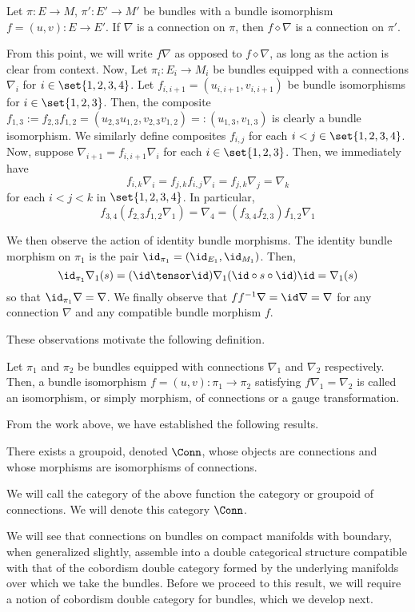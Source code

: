 \begin{thm}
Let $\pi : E \to M$, $\pi' : E' \to M'$ be bundles with a bundle isomorphism
$f = (u, v) : E \to E'$. If $\nabla$ is a connection on $\pi$, then
$f \diamond \nabla$ is a connection on $\pi'$.
\end{thm}

From this point, we will write $f\nabla$ as opposed to $f \diamond \nabla$,
as long as the action is clear from context. Now, Let $\pi_i : E_i \to M_i$ be
bundles equipped with a connections
$\nabla_i$ for $i \in \set{1, 2, 3, 4}$. Let
$f_{i, i + 1} = (u_{i, i + 1}, v_{i, i + 1})$
be bundle isomorphisms for $i \in \set{1, 2, 3}$. Then, the composite
$f_{1, 3} := f_{2, 3}f_{1, 2} = (u_{2, 3}u_{1, 2}, v_{2, 3}v_{1, 2})
=: (u_{1, 3}, v_{1, 3})$ is clearly a bundle isomorphism. We similarly define
composites $f_{i, j}$ for each $i < j \in \set{1, 2, 3, 4}$. Now, suppose
$\nabla_{i + 1} = f_{i, i + 1}\nabla_i$ for each $i \in \set{1, 2, 3}$. Then, we
immediately have
\[
  f_{i, k}\nabla_i = f_{j, k}f_{i, j}\nabla_i = f_{j, k}\nabla_j = \nabla_k
\]
for each $i < j < k$ in $\set{1, 2, 3, 4}$. In particular,
\[
  f_{3, 4}(f_{2, 3}f_{1, 2}\nabla_1) = \nabla_4
    = (f_{3, 4}f_{2, 3})f_{1, 2}\nabla_1
\]

We then observe the action of identity bundle morphisms. The identity bundle
morphism on $\pi_1$ is the pair $\id_{\pi_1} = (\id_{E_1}, \id_{M_1})$. Then,
\[
  \id_{\pi_1}\nabla_1(s)
    = (\id \tensor \id) \nabla_1(\id \circ s \circ \id) \id
    = \nabla_1(s)
\]
so that $\id_{\pi_1}\nabla = \nabla$. We finally observe that
$ff^{-1}\nabla = \id\nabla = \nabla$ for any connection $\nabla$ and any
compatible bundle morphism $f$.

These observations motivate the following definition.
\begin{defn}
Let $\pi_1$ and $\pi_2$ be bundles equipped with connections $\nabla_1$ and
$\nabla_2$ respectively. Then, a bundle isomorphism
$f = (u, v) : \pi_1 \to \pi_2$ satisfying $f\nabla_1 = \nabla_2$ is called an
isomorphism, or simply morphism, of connections or a gauge transformation.
\end{defn}

From the work above, we have established the following results.
\begin{thm}
There exists a groupoid, denoted $\Conn$, whose objects are connections and
whose morphisms are isomorphisms of connections.
\end{thm}
\begin{defn}
We will call the category of the above function the category or groupoid of
connections. We will denote this category $\Conn$.
\end{defn}

We will see that connections on bundles on compact manifolds with boundary, when
generalized slightly, assemble into a double categorical structure compatible
with that of the cobordism double category formed by the underlying manifolds
over which we take the bundles. Before we proceed to this result, we will
require a notion of cobordism double category for bundles, which we develop
next.



